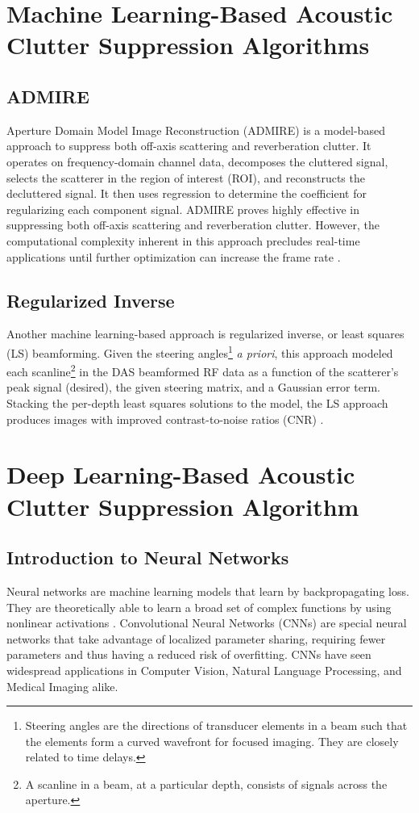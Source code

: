   \section{Machine Learning-Based Acoustic Clutter Suppression Algorithms}
    \subsection{ADMIRE}

      Aperture Domain Model Image Reconstruction (ADMIRE) is a model-based approach to suppress both off-axis scattering and reverberation clutter. It operates on frequency-domain channel data, decomposes the cluttered signal, selects the scatterer in the region of interest (ROI), and reconstructs the decluttered signal. It then uses regression to determine the coefficient for regularizing each component signal. ADMIRE proves highly effective in suppressing both off-axis scattering and reverberation clutter. However, the computational complexity inherent in this approach precludes real-time applications until further optimization can increase the frame rate \cite{dei_thesis, admire2015}.

    \subsection{Regularized Inverse}
      Another machine learning-based approach is regularized inverse, or least squares (LS) beamforming. Given the steering angles\footnote{Steering angles are the directions of transducer elements in a beam such that the elements form a curved wavefront for focused imaging. They are closely related to time delays.} \textit{a priori}, this approach modeled each scanline\footnote{A scanline in a beam, at a particular depth, consists of signals across the aperture.} in the DAS beamformed RF data as a function of the scatterer's peak signal (desired), the given steering matrix, and a Gaussian error term. Stacking the per-depth least squares solutions to the model, the LS approach produces images with improved contrast-to-noise ratios (CNR) \cite{szasz_regularized_inverse}. %

  \section{Deep Learning-Based Acoustic Clutter Suppression Algorithm} %
    \subsection{Introduction to Neural Networks}
      Neural networks are machine learning models that learn by backpropagating loss. They are theoretically able to learn a broad set of complex functions by using nonlinear activations \cite{rumelhart1985learning}. Convolutional Neural Networks (CNNs) are special neural networks that take advantage of localized parameter sharing, requiring fewer parameters and thus having a reduced risk of overfitting. CNNs have seen widespread applications in Computer Vision, Natural Language Processing, and Medical Imaging alike.

